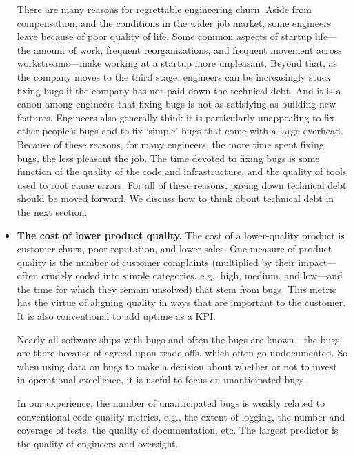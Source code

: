 \documentclass[12pt, letterpaper]{article}
\begin{document}
\begin{itemize}
There are many reasons for regrettable engineering churn. Aside from compensation, and the conditions in the wider job market, some engineers leave because of poor quality of life. Some common aspects of startup life—the amount of work, frequent reorganizations, and frequent movement across workstreams—make working at a startup more unpleasant. Beyond that, as the company moves to the third stage, engineers can be increasingly stuck fixing bugs if the company has not paid down the technical debt. And it is a canon among engineers that fixing bugs is not as satisfying as building new features. Engineers also generally think it is particularly unappealing to fix other people’s bugs and to fix ‘simple’ bugs that come with a large overhead. Because of these reasons, for many engineers, the more time spent fixing bugs, the less pleasant the job. The time devoted to fixing bugs is some function of the quality of the code and infrastructure, and the quality of tools used to root cause errors. For all of these reasons, paying down technical debt should be moved forward. We discuss how to think about technical debt in the next section.

\item \textbf{The cost of lower product quality.} The cost of a lower-quality product is customer churn, poor reputation, and lower sales. One measure of product quality is the number of customer complaints (multiplied by their impact—often crudely coded into simple categories, e.g., high, medium, and low—and the time for which they remain unsolved) that stem from bugs. This metric has the virtue of aligning quality in ways that are important to the customer. It is also conventional to add uptime as a KPI. 

Nearly all software ships with bugs and often the bugs are known—the bugs are there because of agreed-upon trade-offs, which often go undocumented. So when using data on bugs to make a decision about whether or not to invest in operational excellence, it is useful to focus on unanticipated bugs.

In our experience, the number of unanticipated bugs is weakly related to conventional code quality metrics, e.g., the extent of logging, the number and coverage of tests, the quality of documentation, etc. The largest predictor is the quality of engineers and oversight.   


\end{itemize}
\end{document}
